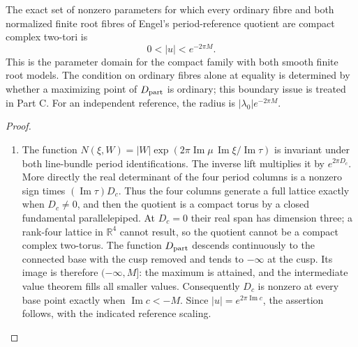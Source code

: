 \begin{proposition}\label{fam:src:B.1.2}\label{fam:st:B.1.2}

The exact set of nonzero parameters for which every ordinary fibre and both normalized finite root fibres of Engel's period-reference quotient are compact complex two-tori is
\[
 0<|u|<e^{-2\pi M}.
\]
This is the parameter domain for the compact family with both smooth finite root models. The condition on ordinary fibres alone at equality is determined by whether a maximizing point of $D_{\rm part}$ is ordinary; this boundary issue is treated in Part C. For an independent reference, the radius is $|\lambda_0|e^{-2\pi M}$.
\end{proposition}


\begin{proof}
\begin{enumerate}[label=\arabic*.,leftmargin=*]
\item The function $N(\xi,W)=|W|\exp(2\pi\operatorname{Im}\mu\,\operatorname{Im}\xi/\operatorname{Im}\tau)$ is invariant under both line-bundle period identifications. The inverse lift multiplies it by $e^{2\pi D_c}$. More directly the real determinant of the four period columns is a nonzero sign times $(\operatorname{Im}\tau)D_c$. Thus the four columns generate a full lattice exactly when $D_c\ne0$, and then the quotient is a compact torus by a closed fundamental parallelepiped. At $D_c=0$ their real span has dimension three; a rank-four lattice in $\mathbb R^4$ cannot result, so the quotient cannot be a compact complex two-torus. The function $D_{\rm part}$ descends continuously to the connected base with the cusp removed and tends to $-\infty$ at the cusp. Its image is therefore $(-\infty,M]$: the maximum is attained, and the intermediate value theorem fills all smaller values. Consequently $D_c$ is nonzero at every base point exactly when $\operatorname{Im}c<-M$. Since $|u|=e^{2\pi\operatorname{Im}c}$, the assertion follows, with the indicated reference scaling.
\end{enumerate}
\end{proof}

